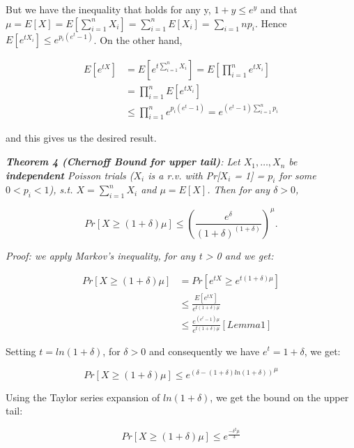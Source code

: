 \documentclass[11pt]{article}
\begin{document}
But we have the inequality that holds for any y, $1 + y \leq e^y$ and that $\mu = E[X] = E[\sum_{i=1}^{n}X_i] = \sum_{i=1}^{n}E[X_i] = \sum_{i=1}{n}p_i$. Hence $E[e^{tX_i}] \leq e^{p_i(e^t-1)}$. On the other hand,

\begin{equation}
\begin{split}
 E[e^{tX}]& = E[e^{t\sum_{i=1}^{n}X_i}] = E[\prod_{i=1}^{n}e^{tX_i}] \\
 & = \prod_{i = 1}^{n}E[e^{tX_i}] \\  
 & \leq \prod_{i = 1}^{n} e^{p_i(e^t-1)} = e^{(e^t-1)\sum_{i=1}^{n}p_i}
\end{split}
\end{equation}

and this gives us the desired result.

\medskip
\textit{\textbf{Theorem 4 (Chernoff Bound for upper tail)}: Let $X_1, \dots , X_n$ be \textbf{independent} Poisson trials ($X_i$ is a r.v. with Pr[$X_i$ = 1] = $p_i$ for some $0 < p_i < 1$), s.t. $X = \sum_{i = 1}^{n}X_i$ and $\mu = E[X]$. Then for any $\delta > 0$,}

\begin{equation}
 Pr[X \geq (1+\delta)\mu] \leq (\frac{e^{\delta}}{{(1+\delta)}^{(1 + \delta)}})^{\mu}. 
\end{equation}

\emph{Proof: we apply Markov's inequality, for any t > 0 and we get:} 

\begin{equation}
\begin{split}
  Pr[X \geq (1+\delta)\mu]& = Pr[e^{tX} \geq e^{t(1+\delta)\mu}] \\
  & \leq \frac{E[e^{tX}]}{e^{t(1+\delta)\mu}} \\
 & \leq \frac{e^{(e^t - 1)\mu}}{e^{t(1+\delta)\mu}}  [Lemma 1]
\end{split}  
\end{equation}

Setting $t = ln(1+\delta)$, for $\delta > 0$ and consequently we have $e^t = 1 + \delta$, we get:

\begin{equation}
  Pr[X \geq (1+\delta)\mu] \leq {e^{(\delta - (1+\delta)ln(1+\delta))}}^\mu
\end{equation}

Using the Taylor series expansion of $ln(1+\delta)$, we get the bound on the upper tail: 

\begin{equation}
 Pr[X \geq (1+\delta)\mu] \leq e^\frac{-\delta^2\mu}{3}
\end{equation}
\end{document}
